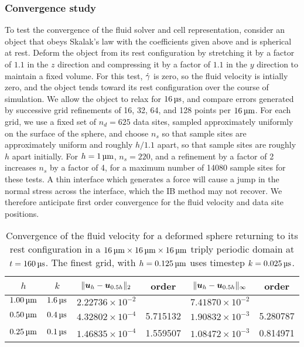 \subsubsection{Convergence study}
To test the convergence of the fluid solver and cell representation, consider 
an object that obeys Skalak's law with the coefficients given above and is
spherical at rest. Deform the object from its rest configuration by stretching
it by a factor of $1.1$ in the $z$ direction and compressing it by a factor of
$1.1$ in the $y$ direction to maintain a fixed volume. For this test, $\dot{\gamma}$
is zero, so the fluid velocity is intially zero, and the object tends toward
its rest configuration over the course of simulation. We allow the object to
relax for $16\us$, and compare errors generated by successive grid refinements
of 16, 32, 64, and 128 points per $16\um$. For each grid, we use a fixed set of
$n_d=625$ data sites, sampled approximately uniformly on the surface of the
sphere, and choose $n_s$ so that sample sites are approximately uniform and
roughly $h/1.1$ apart, so that sample sites are roughly $h$ apart initially.
For $h=1\um$, $n_s=220$, and a refinement by a factor of 2 increases $n_s$ by a
factor of 4, for a maximum number of 14080 sample sites for these tests. A thin
interface which generates a force will cause a jump in the normal stress across
the interface, which the IB method may not recover. We therefore anticipate
first order convergence for the fluid velocity and data site positions.

\begin{table}
    \begin{center}
        \begingroup
        \setlength{\tabcolsep}{9pt}
        \renewcommand{\arraystretch}{1.5}
        \begin{tabular}{cc|cc|cc}
                                                                                                                 \\ \toprule
            $h$       & $k$       & $\|\boldsymbol{u}_h-\boldsymbol{u}_{0.5h}\|_2$ & order    & $\|\boldsymbol{u}_h-\boldsymbol{u}_{0.5h}\|_{\infty}$ & order    \\ \midrule
            $1.00\um$ & $1.6\us$ & $2.22736\times10^{-2}$ &          & $7.41870\times10^{-2}$        &          \\
            $0.50\um$ & $0.4\us$ & $4.32802\times10^{-4}$ & 5.715132 & $1.90832\times10^{-3}$        & 5.280787 \\
            $0.25\um$ & $0.1\us$ & $1.46835\times10^{-4}$ & 1.559507 & $1.08472\times10^{-3}$        & 0.814971 \\ \bottomrule
        \end{tabular}
        \endgroup
    \end{center}
    \caption{%
Convergence of the fluid velocity for a deformed sphere returning to its rest
configuration in a $16\um\times16\um\times16\um$ triply periodic domain at
$t=160\us$. The finest grid, with $h=0.125\um$ uses timestep $k=0.025\us$.
    }
    \label{tab:u-convergence}
\end{table}

